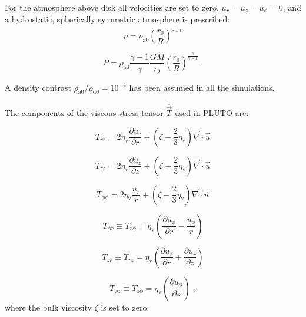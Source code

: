 \documentclass{aa}
\begin{document}
\begin{appendix}
For the atmosphere above disk all velocities are set to zero, $u_r=u_z=u_\phi=0$, and a hydrostatic, spherically symmetric atmosphere is prescribed:
\begin{equation}
\rho=\rho_\mathrm{a0} \left(\frac{r_0}{R}\right)^{\frac{1}{\gamma-1}}
\end{equation}

\begin{equation}
P=\rho_\mathrm{a0} \frac{\gamma-1}{\gamma} \frac{GM}{r_0} \left(\frac{r_0}{R}\right)^{\frac{\gamma}{\gamma-1}} \; .
\end{equation}

A density contrast $\rho_\mathrm{a0}/\rho_\mathrm{d0} =10^{-4}$ has been assumed in all the simulations.


The components of the viscous stress tensor ${\overline {\overline {\vec T}}}$ used in PLUTO are:

\begin{equation}
T_{rr}=2 \eta_\mathrm{v} \frac{\partial u_r}{\partial r} + \left(\zeta - \frac{2}{3}\eta_\mathrm{v} \right) \vec \nabla \cdot \vec{u}
\end{equation}

\begin{equation}
T_{zz}=2 \eta_\mathrm{v} \frac{\partial u_z}{\partial z} + \left(\zeta - \frac{2}{3}\eta_\mathrm{v} \right) \vec \nabla \cdot \vec{u}
\end{equation}

\begin{equation}
T_{\phi\phi}=2 \eta_\mathrm{v} \frac{ u_r}{ r} + \left( \zeta - \frac{2}{3}\eta_\mathrm{v} \right) \vec \nabla \cdot \vec{u}
\end{equation}


\begin{equation}
T_{\phi r} \equiv T_{r\phi}= \eta_\mathrm{v} \left( \frac{\partial u_\phi}{\partial r} -\frac{u_{\phi}}{r} \right)
\end{equation}

\begin{equation}
T_{zr} \equiv T_{rz}= \eta_\mathrm{v} \left( \frac{\partial u_z}{\partial r} + \frac{\partial u_r}{\partial z} \right)
\end{equation}

\begin{equation}
 T_{\phi z} \equiv T_{z\phi}= \eta_\mathrm{v} \left( \frac{\partial u_\phi}{\partial z} \right) \; ,
\end{equation}
where the bulk viscosity $\zeta$ is set to zero.

\end{appendix}
\end{document}
